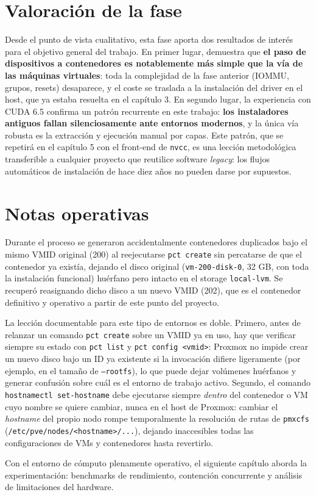 \section{Valoración de la fase}

Desde el punto de vista cualitativo, esta fase aporta dos resultados de interés para el objetivo general del trabajo. En primer lugar, demuestra que \textbf{el paso de dispositivos a contenedores es notablemente más simple que la vía de las máquinas virtuales}: toda la complejidad de la fase anterior (IOMMU, grupos, resets) desaparece, y el coste se traslada a la instalación del driver en el host, que ya estaba resuelta en el capítulo 3. En segundo lugar, la experiencia con CUDA 6.5 confirma un patrón recurrente en este trabajo: \textbf{los instaladores antiguos fallan silenciosamente ante entornos modernos}, y la única vía robusta es la extracción y ejecución manual por capas. Este patrón, que se repetirá en el capítulo 5 con el front-end de \texttt{nvcc}, es una lección metodológica transferible a cualquier proyecto que reutilice software \textit{legacy}: los flujos automáticos de instalación de hace diez años no pueden darse por supuestos.

\section{Notas operativas}

Durante el proceso se generaron accidentalmente contenedores duplicados bajo el mismo VMID original (200) al reejecutarse \texttt{pct create} sin percatarse de que el contenedor ya existía, dejando el disco original (\texttt{vm-200-disk-0}, 32 GB, con toda la instalación funcional) huérfano pero intacto en el storage \texttt{local-lvm}. Se recuperó reasignando dicho disco a un nuevo VMID (202), que es el contenedor definitivo y operativo a partir de este punto del proyecto.

La lección documentable para este tipo de entornos es doble. Primero, antes de relanzar un comando \texttt{pct create} sobre un VMID ya en uso, hay que verificar siempre su estado con \texttt{pct list} y \texttt{pct config <vmid>}: Proxmox no impide crear un nuevo disco bajo un ID ya existente si la invocación difiere ligeramente (por ejemplo, en el tamaño de \texttt{--rootfs}), lo que puede dejar volúmenes huérfanos y generar confusión sobre cuál es el entorno de trabajo activo. Segundo, el comando \texttt{hostnamectl set-hostname} debe ejecutarse siempre \emph{dentro} del contenedor o VM cuyo nombre se quiere cambiar, nunca en el host de Proxmox: cambiar el \textit{hostname} del propio nodo rompe temporalmente la resolución de rutas de \texttt{pmxcfs} (\texttt{/etc/pve/nodes/<hostname>/...}), dejando inaccesibles todas las configuraciones de VMs y contenedores hasta revertirlo.

Con el entorno de cómputo plenamente operativo, el siguiente capítulo aborda la experimentación: benchmarks de rendimiento, contención concurrente y análisis de limitaciones del hardware.

